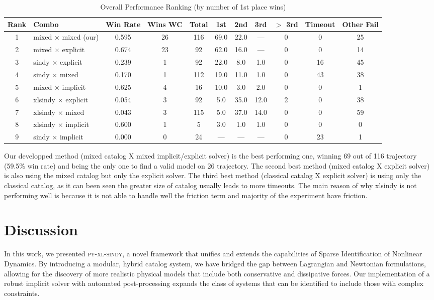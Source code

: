 \documentclass[12pt]{article}
\newcommand{\frameworkname}{\textsc{py-xl-sindy}}
\begin{document}
\begin{table}[h]
\centering
\caption{Overall Performance Ranking (by number of 1st place wins)}
\label{tab:results_summary}
\small
\begin{tabular}{clccccccccc}
\hline
\textbf{Rank} & \textbf{Combo} & \textbf{Win Rate} & \textbf{Wins WC} & \textbf{Total} & \textbf{1st} & \textbf{2nd} & \textbf{3rd} & \textbf{$>$ 3rd} & \textbf{Timeout} & \textbf{Other Fail} \\
\hline
1 & mixed $\times$ mixed (our)& 0.595 & 26 & 116 & 69.0 & 22.0 & --- & 0 & 0 & 25 \\
2 & mixed $\times$ explicit& 0.674 & 23 & 92 & 62.0 & 16.0 & --- & 0 & 0 & 14 \\
3 & sindy $\times$ explicit & 0.239 & 1 & 92 & 22.0 & 8.0 & 1.0 & 0 & 16 & 45 \\
4 & sindy $\times$ mixed & 0.170 & 1 & 112 & 19.0 & 11.0 & 1.0 & 0 & 43 & 38 \\
5 & mixed $\times$ implicit & 0.625 & 4 & 16 & 10.0 & 3.0 & 2.0 & 0 & 0 & 1 \\
6 & xlsindy $\times$ explicit & 0.054 & 3 & 92 & 5.0 & 35.0 & 12.0 & 2 & 0 & 38 \\
7 & xlsindy $\times$ mixed & 0.043 & 3 & 115 & 5.0 & 37.0 & 14.0 & 0 & 0 & 59 \\
8 & xlsindy $\times$ implicit & 0.600 & 1 & 5 & 3.0 & 1.0 & 1.0 & 0 & 0 & 0 \\
9 & sindy $\times$ implicit & 0.000 & 0 & 24 & --- & --- & --- & 0 & 23 & 1 \\
\hline
\end{tabular}
\end{table}

Our developped method (mixed catalog X mixed implicit/explicit solver) is the best performing one, winning 69 out of 116 trajectory (59.5\% win rate) and being the only one to find a valid model on 26 trajectory. The second best method (mixed catalog X explicit solver) is also using the mixed catalog but only the explicit solver. The third best method (classical catalog X explicit solver) is using only the classical catalog, as it can been seen the greater size of catalog usually leads to more timeouts. 
The main reason of why xlsindy is not performing well is because it is not able to handle well the friction term and majority of the experiment have friction.


\section*{Discussion}
In this work, we presented \frameworkname, a novel framework that unifies and extends the capabilities of Sparse Identification of Nonlinear Dynamics. By introducing a modular, hybrid catalog system, we have bridged the gap between Lagrangian and Newtonian formulations, allowing for the discovery of more realistic physical models that include both conservative and dissipative forces. Our implementation of a robust implicit solver with automated post-processing expands the class of systems that can be identified to include those with complex constraints.
\end{document}
